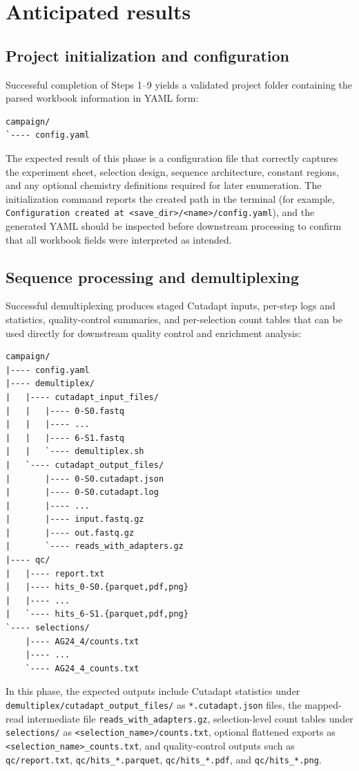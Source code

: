 \section{Anticipated results}

\subsection{Project initialization and configuration}
Successful completion of Steps 1--9 yields a validated project folder containing the parsed workbook information in YAML form:

\begin{lstlisting}
campaign/
`---- config.yaml
\end{lstlisting}

The expected result of this phase is a configuration file that correctly captures the experiment sheet, selection design, sequence architecture, constant regions, and any optional chemistry definitions required for later enumeration. The initialization command reports the created path in the terminal (for example, \texttt{Configuration created at <save\_dir>/<name>/config.yaml}), and the generated YAML should be inspected before downstream processing to confirm that all workbook fields were interpreted as intended.

\subsection{Sequence processing and demultiplexing}
Successful demultiplexing produces staged Cutadapt inputs, per-step logs and statistics, quality-control summaries, and per-selection count tables that can be used directly for downstream quality control and enrichment analysis:

\begin{lstlisting}
campaign/
|---- config.yaml
|---- demultiplex/
|   |---- cutadapt_input_files/
|   |   |---- 0-S0.fastq
|   |   |---- ...
|   |   |---- 6-S1.fastq
|   |   `---- demultiplex.sh
|   `---- cutadapt_output_files/
|       |---- 0-S0.cutadapt.json
|       |---- 0-S0.cutadapt.log
|       |---- ...
|       |---- input.fastq.gz
|       |---- out.fastq.gz
|       `---- reads_with_adapters.gz
|---- qc/
|   |---- report.txt
|   |---- hits_0-S0.{parquet,pdf,png}
|   |---- ...
|   `---- hits_6-S1.{parquet,pdf,png}
`---- selections/
    |---- AG24_4/counts.txt
    |---- ...
    `---- AG24_4_counts.txt
\end{lstlisting}

In this phase, the expected outputs include Cutadapt statistics under \texttt{demultiplex/cutadapt\_output\_files/} as \texttt{*.cutadapt.json} files, the mapped-read intermediate file \texttt{reads\_with\_adapters.gz}, selection-level count tables under \texttt{selections/} as \texttt{<selection\_name>/counts.txt}, optional flattened exports as \texttt{<selection\_name>\_counts.txt}, and quality-control outputs such as \texttt{qc/report.txt}, \texttt{qc/hits\_*.parquet}, \texttt{qc/hits\_*.pdf}, and \texttt{qc/hits\_*.png}.

